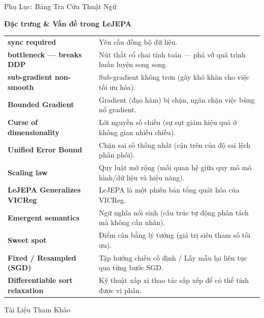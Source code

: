 \documentclass[aspectratio=169,9pt]{beamer}
\begin{document}
\begin{frame}[allowframebreaks]{Phụ Lục: Bảng Tra Cứu Thuật Ngữ}
  \framebreak

  \begin{accentbox}
  \footnotesize \textbf{Đặc trưng \& Vấn đề trong LeJEPA}
  \end{accentbox}
  \vspace{0.5em}
  {\scriptsize
  \renewcommand{\arraystretch}{1.4}
  \begin{tabular}{@{} >{\bfseries\color{maccent!75!black}}l p{10.5cm} @{}}
    sync required & Yêu cầu đồng bộ dữ liệu. \\
    bottleneck — breaks DDP & Nút thắt cổ chai tính toán — phá vỡ quá trình huấn luyện song song. \\
    sub-gradient non-smooth & Sub-gradient không trơn (gây khó khăn cho việc tối ưu hóa). \\
    Bounded Gradient & Gradient (đạo hàm) bị chặn, ngăn chặn việc bùng nổ gradient. \\
    Curse of dimensionality & Lời nguyền số chiều (sự sụt giảm hiệu quả ở không gian nhiều chiều). \\
    Unified Error Bound & Chặn sai số thống nhất (cận trên của độ sai lệch phân phối). \\
    Scaling law & Quy luật mở rộng (mối quan hệ giữa quy mô mô hình/dữ liệu và hiệu năng). \\
    LeJEPA Generalizes VICReg & LeJEPA là một phiên bản tổng quát hóa của VICReg. \\
    Emergent semantics & Ngữ nghĩa nổi sinh (cấu trúc tự động phân tách mà không cần nhãn). \\
    Sweet spot & Điểm cân bằng lý tưởng (giá trị siêu tham số tối ưu). \\
    Fixed / Resampled (SGD) & Tập hướng chiếu cố định / Lấy mẫu lại liên tục qua từng bước SGD. \\
    Differentiable sort relaxation & Kỹ thuật xấp xỉ thao tác sắp xếp để có thể tính được vi phân. \\
  \end{tabular}
  }
\end{frame}

\begin{frame}[allowframebreaks]{Tài Liệu Tham Khảo}
\nocite{*}


\end{frame}
\end{document}

